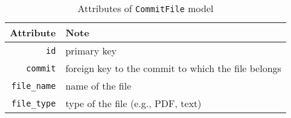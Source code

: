 \begin{table}[H]
    \centering
    \caption{Attributes of \texttt{CommitFile} model}
    \label{tab:COMMIT_FILE_ATTR}
    \renewcommand{\arraystretch}{1.3}
    \begin{tabular}[H]{r|l}
        \hline
        Attribute & Note \\
        \hline
        \hline
        \texttt{id} & primary key \\
        \hline
        \texttt{commit} & foreign key to the commit to which the file belongs \\
        \hline
        \texttt{file\_name} & name of the file \\
        \hline
        \texttt{file\_type} & type of the file (e.g., PDF, text) \\
        \hline
    \end{tabular}
\end{table}

